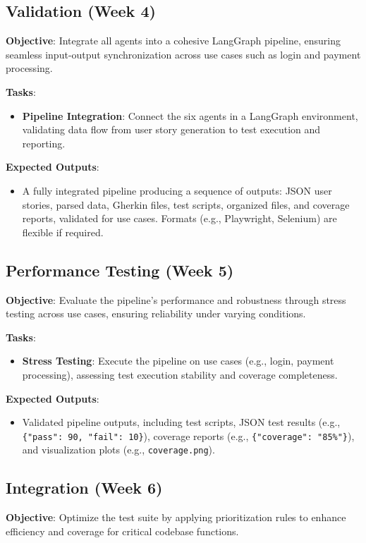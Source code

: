 \documentclass{article}
\begin{document}
\subsection{Validation (Week 4)}
\textbf{Objective}: Integrate all agents into a cohesive LangGraph pipeline, ensuring seamless input-output synchronization across use cases such as login and payment processing.

\textbf{Tasks}:
\begin{itemize}[label=--]
    \item \textbf{Pipeline Integration}: Connect the six agents in a LangGraph environment, validating data flow from user story generation to test execution and reporting.
\end{itemize}

\textbf{Expected Outputs}:
\begin{itemize}[label=--]
    \item A fully integrated pipeline producing a sequence of outputs: JSON user stories, parsed data, Gherkin files, test scripts, organized files, and coverage reports, validated for use cases. Formats (e.g., Playwright, Selenium) are flexible if required.
\end{itemize}

\subsection{Performance Testing (Week 5)}
\textbf{Objective}: Evaluate the pipeline’s performance and robustness through stress testing across use cases, ensuring reliability under varying conditions.

\textbf{Tasks}:
\begin{itemize}[label=--]
    \item \textbf{Stress Testing}: Execute the pipeline on use cases (e.g., login, payment processing), assessing test execution stability and coverage completeness.
\end{itemize}

\textbf{Expected Outputs}:
\begin{itemize}[label=--]
    \item Validated pipeline outputs, including test scripts, JSON test results (e.g., \texttt{\{"pass": 90, "fail": 10\}}), coverage reports (e.g., \texttt{\{"coverage": "85\%"\}}), and visualization plots (e.g., \texttt{coverage.png}).
\end{itemize}

\subsection{Integration (Week 6)}
\textbf{Objective}: Optimize the test suite by applying prioritization rules to enhance efficiency and coverage for critical codebase functions.
\end{document}

